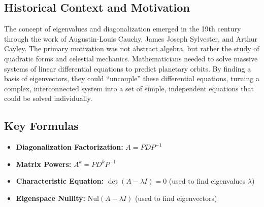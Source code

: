 \documentclass[11pt, a4paper]{article}
\theoremstyle{definition}
\theoremstyle{remark}
\newcommand{\R}{\mathbb{R}}
\begin{document}
\begin{center}
\end{center}

\subsection{Historical Context and Motivation}
The concept of eigenvalues and diagonalization emerged in the 19th century through the work of Augustin-Louis Cauchy, James Joseph Sylvester, and Arthur Cayley. The primary motivation was not abstract algebra, but rather the study of quadratic forms and celestial mechanics. Mathematicians needed to solve massive systems of linear differential equations to predict planetary orbits. By finding a basis of eigenvectors, they could ``uncouple'' these differential equations, turning a complex, interconnected system into a set of simple, independent equations that could be solved individually.

\subsection{Key Formulas}
\begin{itemize}
    \item \textbf{Diagonalization Factorization:} $A = PDP^{-1}$
    \item \textbf{Matrix Powers:} $A^k = PD^kP^{-1}$
    \item \textbf{Characteristic Equation:} $\det(A - \lambda I) = 0$ (used to find eigenvalues $\lambda$)
    \item \textbf{Eigenspace Nullity:} $\text{Nul}(A - \lambda I)$ (used to find eigenvectors)
\end{itemize}
\end{document}
